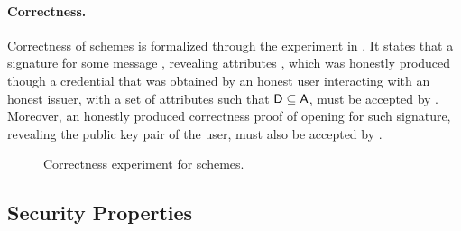 \paragraph{Correctness.} %
Correctness of \GSAC schemes is formalized through the experiment in
. It states that a signature for some message \msg,
revealing attributes \DAttrs, which was honestly produced though a credential
that was obtained by an honest user interacting with an honest issuer, with a
set of attributes \Attrs such that $\mathsf{D} \subseteq \mathsf{A}$, must be accepted
by \Verify. Moreover, an honestly produced correctness proof of opening for such
signature, revealing the public key pair of the user, must also be accepted by
\Judge.

\begin{figure}[htp!]
  \caption{Correctness experiment for \GSAC schemes.}
  \label{fig:exp-gsac-corr}
\end{figure}

\subsection{Security Properties}
\label{ssec:security}

